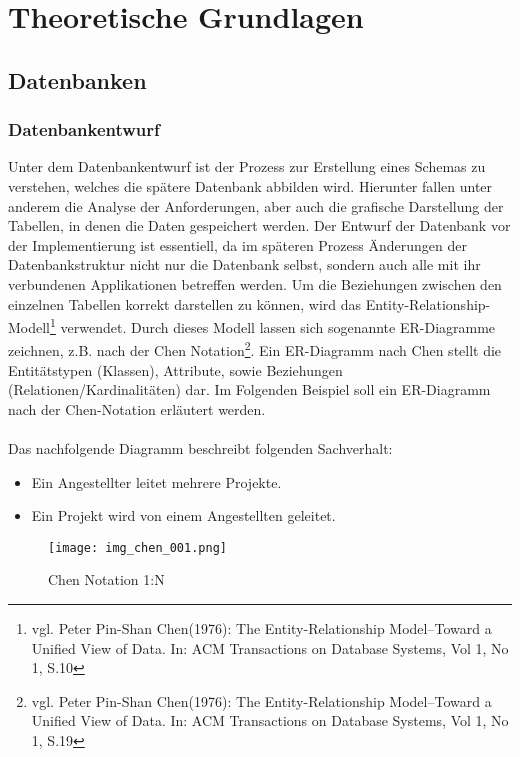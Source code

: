 \chapter{Theoretische Grundlagen}
\label{cha:theogrund}

\section{Datenbanken}

\subsection{Datenbankentwurf}
\label{sec:erm}

Unter dem Datenbankentwurf ist der Prozess zur Erstellung eines Schemas zu verstehen, welches die spätere Datenbank abbilden wird.
Hierunter fallen unter anderem die Analyse der Anforderungen, aber auch die grafische Darstellung der Tabellen, in denen die Daten gespeichert werden.
Der Entwurf der Datenbank vor der Implementierung ist essentiell, da im späteren Prozess Änderungen der Datenbankstruktur nicht nur die Datenbank selbst, sondern auch alle mit ihr verbundenen Applikationen betreffen werden.
Um die Beziehungen zwischen den einzelnen Tabellen korrekt darstellen zu können, wird das Entity-Relationship-Modell\footnote{vgl. Peter Pin-Shan Chen(1976): The Entity-Relationship Model--Toward a Unified View of Data. In: ACM Transactions on Database Systems, Vol 1, No 1, S.10} verwendet.
Durch dieses Modell lassen sich sogenannte ER-Diagramme zeichnen, z.B. nach der Chen Notation\footnote{vgl. Peter Pin-Shan Chen(1976): The Entity-Relationship Model--Toward a Unified View of Data. In: ACM Transactions on Database Systems, Vol 1, No 1, S.19}.
Ein ER-Diagramm nach Chen stellt die Entitätstypen (Klassen), Attribute, sowie Beziehungen (Relationen/Kardinalitäten) dar.
Im Folgenden Beispiel soll ein ER-Diagramm nach der Chen-Notation erläutert werden.\\\\
Das nachfolgende Diagramm beschreibt folgenden Sachverhalt:

\begin{itemize}
\item Ein Angestellter leitet mehrere Projekte.
\item Ein Projekt wird von einem Angestellten geleitet.
\end{itemize}

\begin{figure}[H]
\begin{center}
\texttt{[image: img\_chen\_001.png]}
\caption{Chen Notation 1:N}
\label{chenpic1}
\end{center}
\end{figure}


